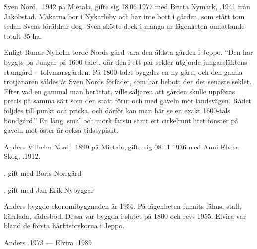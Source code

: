 


Sven Nord, .1942 på Mietala, gifte sig 18.06.1977 med Britta Nymark, .1941 från Jakobstad. Makarna bor i Nykarleby och har inte bott i gården, som stått tom sedan Svens föräldrar dog. Sven skötte dock i många år lägenheten omfattande totalt 35 ha.

Enligt Runar Nyholm torde Nords gård vara den äldsta gården i Jeppo. ``Den har byggts på Jungar på 1600-talet, där den i ett par sekler utgjorde jungarsläktens stamgård – tolvmansgården. På 1800-talet byggdes en ny gård, och den gamla trotjänaren såldes åt Sven Nords förfäder, som har bebott den det senaste seklet. Efter vad en gammal man berättat, ville säljaren att gården skulle uppföras precis på samma sätt som den stått förut och med gaveln mot landsvägen. Rådet följdes till punkt och pricka, och därför kan man här se en exakt 1600-tals bondgård.'' En lång, smal och mörk farstu samt ett cirkelrunt litet fönster på gaveln mot öster är också tidstypiskt.


Anders Vilhelm Nord, .1899 på Mietala, gifte sig 08.11.1936 med Anni Elvira Skog, .1912.
\begin{jhchildren}
  \item {}, gift med Boris Norrgård
  \item {}
  \item {}, gift med Jan-Erik Nybyggar
\end{jhchildren}

Anders byggde ekonomibyggnaden år 1954. På lägenheten funnits fähus, stall, kärrlada, sädesbod. Dessa var byggda i slutet på 1800 och revs 1955. Elvira var bland de första hårfrisörskorna i Jeppo.

Anders .1973  ---  Elvira .1989


